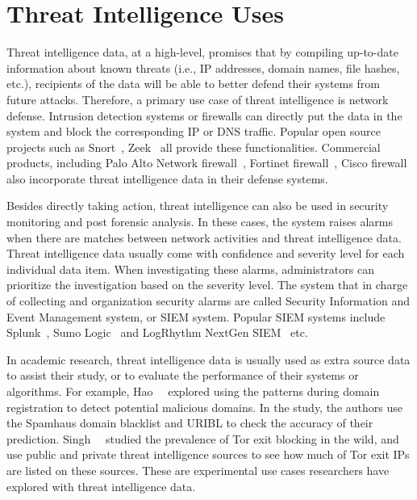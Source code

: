 \section{Threat Intelligence Uses}
\label{sec:threat_intel_uses}

Threat intelligence data, at a high-level, promises that by compiling up-to-date 
information about known threats (i.e., IP addresses, domain names, file hashes, 
etc.), recipients of the data will be able to better defend their systems from 
future attacks. Therefore, a primary use case of threat intelligence is 
network defense. Intrusion detection systems or firewalls can directly put 
the data in the system and block the corresponding IP or DNS traffic. Popular 
open source projects such as Snort~\cite{snortids}, Zeek~\cite{zeekids} all provide 
these functionalities. Commercial products, including Palo Alto Network
firewall~\cite{paloaltofirewall}, Fortinet firewall~\cite{fortinetfirewall}, 
Cisco firewall~\cite{ciscofirewall} also incorporate threat intelligence data in 
their defense systems. 

Besides directly taking action, threat intelligence can also be used in security
monitoring and post forensic analysis. In these cases, the system raises alarms
when there are matches between network activities and threat intelligence data.
Threat intelligence data usually come with confidence and severity level for each
individual data item. When investigating these alarms, administrators can 
prioritize the investigation based on the severity level. The system that in 
charge of collecting and organization security alarms are called Security 
Information and Event Management system, or SIEM system. Popular SIEM systems
include Splunk~\cite{splunk}, Sumo Logic~\cite{sumologic} and LogRhythm NextGen 
SIEM~\cite{logrhythm} etc.

In academic research, threat intelligence data is usually used as extra source 
data to assist their study, or to evaluate the performance of their systems or
algorithms. For example, Hao~\etal~\cite{hao2016predator} explored using the
patterns during domain registration to detect potential malicious
domains. In the study, the authors use the Spamhaus domain blacklist and URIBL to check 
the accuracy of their prediction. Singh~\etal~\cite{singh2017characterizing} 
studied the prevalence of Tor exit blocking in the wild, and use public and
private threat intelligence sources to see how much of Tor exit IPs are listed
on these sources. These are experimental use cases researchers have explored 
with threat intelligence data. 

